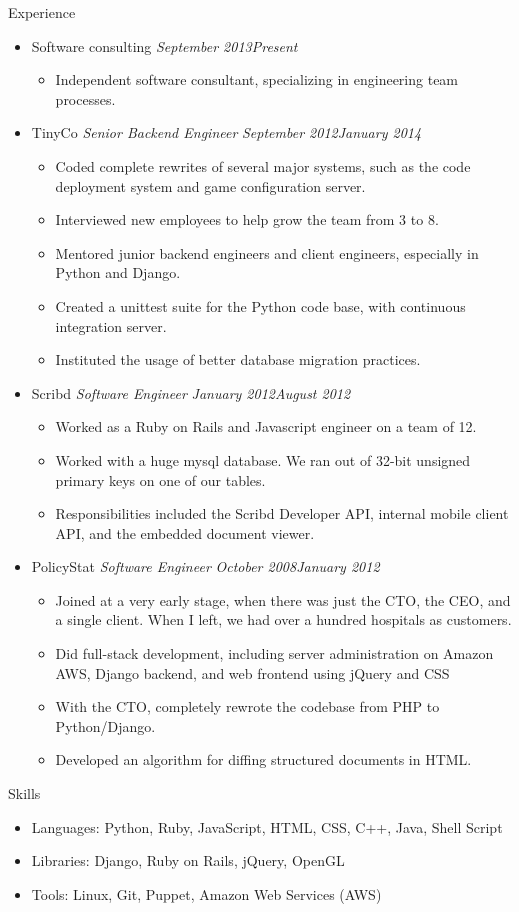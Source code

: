 \documentclass[11pt,oneside]{article}
\newenvironment{ressection}[1]{
    \textrm{\Large#1}
    \begin{itemize}
}{
    \end{itemize}
}
\newcommand{\resitem}[1]{
    \item \begin{flushleft} \textsf{#1} \end{flushleft}
}
\newcommand{\ressubitem}[1]{
    \item \begin{flushleft} \textsf{#1} \end{flushleft}
}
\newcommand{\resbigitem}[3]{
    \item
    \textrm{#1}
    \hspace{5pt}
    \textit{#2}
    \hfill
    \textit{#3}
}
\newenvironment{ressubsec}[3]{
    \resbigitem{#1}{#2}{#3}
    \begin{itemize}
}{
    \end{itemize}
}
\begin{document}
\begin{ressection}{Experience}

    \begin{ressubsec}{Software consulting}{}{September 2013\textendash Present}
        \ressubitem{Independent software consultant, specializing in engineering team processes.}
    \end{ressubsec}

    \begin{ressubsec}{TinyCo}{Senior Backend Engineer}{September 2012\textendash January 2014}
        \ressubitem{Coded complete rewrites of several major systems, such as the code deployment system and game configuration server.}
        \ressubitem{Interviewed new employees to help grow the team from 3 to 8.}
        \ressubitem{Mentored junior backend engineers and client engineers, especially in Python and Django.}
        \ressubitem{Created a unittest suite for the Python code base, with continuous integration server.}
        \ressubitem{Instituted the usage of better database migration practices.}
    \end{ressubsec}

    \begin{ressubsec}{Scribd}{Software Engineer}{January 2012\textendash August 2012}
        \ressubitem{Worked as a Ruby on Rails and Javascript engineer on a team of 12.}
        \ressubitem{Worked with a huge mysql database. We ran out of 32-bit unsigned primary keys on one of our tables.}
        \ressubitem{Responsibilities included the Scribd Developer API, internal mobile client API, and the embedded document viewer.}
    \end{ressubsec}

    \begin{ressubsec}{PolicyStat}{Software Engineer}{October 2008\textendash January 2012}
        \ressubitem{Joined at a very early stage, when there was just the CTO, the CEO, and a single client. When I left, we had over a hundred hospitals as customers.}
        \ressubitem{Did full-stack development, including server administration on Amazon AWS, Django backend, and web frontend using jQuery and CSS}
        \ressubitem{With the CTO, completely rewrote the codebase from PHP to Python/Django.}
        \ressubitem{Developed an algorithm for diffing structured documents in HTML.}
    \end{ressubsec}

\end{ressection}

\begin{ressection}{Skills}
    \resitem{
        \textrm{Languages:}
        Python,
        Ruby,
        JavaScript,
        HTML,
        CSS,
        C++,
        Java,
        Shell Script
    }

    \resitem{
        \textrm{Libraries:}
        Django,
        Ruby on Rails,
        jQuery,
        OpenGL
    }

    \resitem{
        \textrm{Tools:}
        Linux,
        Git,
        Puppet,
        Amazon Web Services (AWS)
    }
\end{ressection}
\end{document}

